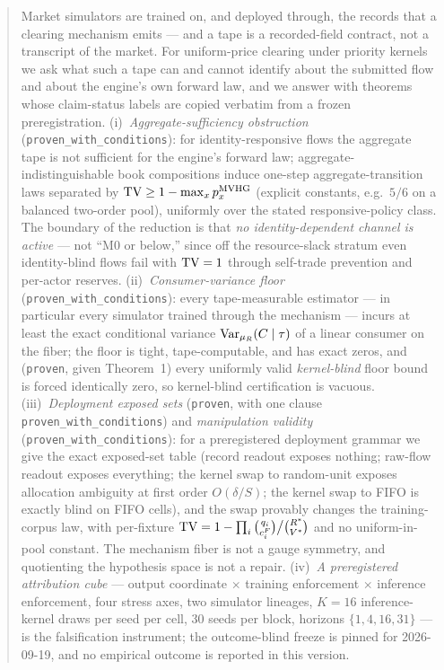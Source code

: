 \begin{abstract}
Market simulators are trained on, and deployed through, the records that a
clearing mechanism emits --- and a tape is a recorded-field contract, not a
transcript of the market. For uniform-price clearing under priority kernels
we ask what such a tape can and cannot identify about the submitted flow and
about the engine's own forward law, and we answer with theorems whose
claim-status labels are copied verbatim from a frozen preregistration.
(i)~\emph{Aggregate-sufficiency obstruction} (\texttt{proven\_with\_conditions}):
for identity-responsive flows the aggregate tape is not sufficient for the
engine's forward law; aggregate-indistinguishable book compositions induce
one-step aggregate-transition laws separated by
$\TV \ge 1 - \max_x p_x^{\MVHG}$ (explicit constants, e.g.\ $5/6$ on a
balanced two-order pool), uniformly over the stated responsive-policy class.
The boundary of the reduction is that \emph{no identity-dependent channel is
active} --- not ``M0 or below,'' since off the resource-slack stratum even
identity-blind flows fail with $\TV = 1$ through self-trade prevention and
per-actor reserves. (ii)~\emph{Consumer-variance floor}
(\texttt{proven\_with\_conditions}): every tape-measurable estimator --- in
particular every simulator trained through the mechanism --- incurs at least
the exact conditional variance $\mathrm{Var}_{\muR}(\Ccons \mid \tape)$ of a
linear consumer on the fiber; the floor is tight, tape-computable, and has
exact zeros, and (\texttt{proven}, given Theorem~1) every uniformly valid
\emph{kernel-blind} floor bound is forced identically zero, so kernel-blind
certification is vacuous. (iii)~\emph{Deployment exposed sets}
(\texttt{proven}, with one clause \texttt{proven\_with\_conditions}) and
\emph{manipulation validity} (\texttt{proven\_with\_conditions}): for a
preregistered deployment grammar we give the exact exposed-set table (record
readout exposes nothing; raw-flow readout exposes everything; the kernel swap
to random-unit exposes allocation ambiguity at first order $O(\delta/S)$; the
kernel swap to FIFO is exactly blind on FIFO cells), and the swap provably
changes the training-corpus law, with per-fixture
$\TV = 1 - \prod_i \binom{q_i}{c_i^{F}}\big/\binom{\Rstar}{\Vstar}$ and no
uniform-in-pool constant. The mechanism fiber is not a gauge symmetry, and
quotienting the hypothesis space is not a repair. (iv)~\emph{A preregistered
attribution cube} --- output coordinate $\times$ training enforcement
$\times$ inference enforcement, four stress axes, two simulator lineages,
$K = 16$ inference-kernel draws per seed per cell, 30 seeds per block,
horizons $\{1,4,16,31\}$ --- is the falsification instrument; the
outcome-blind freeze is pinned for 2026-09-19, and no empirical outcome is
reported in this version.

\smallskip
{}
\end{abstract}
